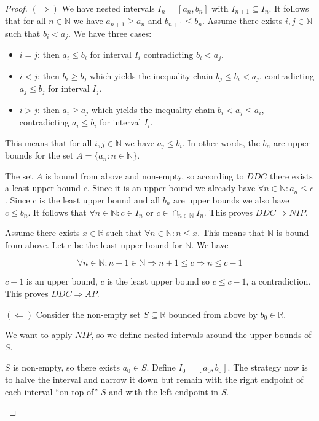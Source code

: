 \begin{proof}
\noindent$(\Rightarrow)$ We have nested intervals $I_n = [a_n, b_n]$ with $I_{n+1} \subseteq I_n$. It follows that for all $n \in \mathbb{N}$ we have $a_{n+1} \geq a_n$ and $b_{n+1} \leq b_n$. Assume there exists $i, j \in \mathbb{N}$ such that $b_i < a_j$. We have three cases: 
\begin{itemize}
\item $i = j$: then $a_i \leq b_i$ for interval $I_i$ contradicting $b_i < a_j$. 
\item $i < j$: then $b_i \geq b_j$ which yields the inequality chain $b_j \leq b_i < a_j$, contradicting $a_j \leq b_j$ for interval $I_j$.
\item $i > j$: then $a_i \geq a_j$ which yields the inequality chain $b_i < a_j \leq a_i$, contradicting $a_i \leq b_i$ for interval $I_i$.
\end{itemize} 
This means that for all $i, j \in \mathbb{N}$ we have $a_j \leq b_i$. In other words, the $b_n$ are upper bounds for the set $A = \{a_n: n \in \mathbb{N}\}$.

The set $A$ is bound from above and non-empty, so according to $DDC$ there exists a least upper bound $c$. Since it is an upper bound we already have $\forall n \in \mathbb{N}: a_n \leq c$. Since $c$ is the least upper bound and all $b_n$ are upper bounds we also have $c \leq b_n$. It follows that $\forall n \in \mathbb{N}: c \in I_n$ or $c \in \cap_{n \in \mathbb{N}} I_n$. This proves $DDC \Rightarrow NIP$.

Assume there exists $x \in \mathbb{R}$ such that $\forall n \in \mathbb{N}: n \leq x$. This means that $\mathbb{N}$ is bound from above. Let $c$ be the least upper bound for $\mathbb{N}$. We have 

$$
\forall n \in \mathbb{N}: n + 1 \in \mathbb{N} \Rightarrow n + 1 \leq c \Rightarrow n \leq c - 1
$$

$c - 1$ is an upper bound, $c$ is the least upper bound so $c \leq c - 1$, a contradiction. This proves $DDC \Rightarrow AP$.

\noindent$(\Leftarrow)$ Consider the non-empty set $S \subseteq \mathbb{R}$ bounded from above by $b_0 \in \mathbb{R}$.

We want to apply $NIP$, so we define nested intervals around the upper bounds of $S$.
\begin{proofpart}\label{defnips}
$S$ is non-empty, so there exists $a_0 \in S$. Define $I_0=[a_0, b_0]$. The strategy now is to halve the interval and narrow it down but remain with the right endpoint of each interval ``on top of'' $S$ and with the left endpoint in $S$.


\end{proofpart}
\end{proof}
